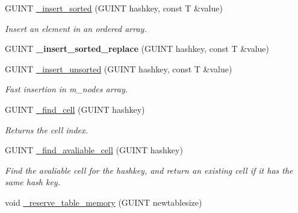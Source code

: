 \begin{DoxyCompactItemize}
\mbox{\label{classgim__hash__table_a66d18cb60b0628a9aa759304395f4825}} 
G\+U\+I\+NT \hyperlink{classgim__hash__table_a66d18cb60b0628a9aa759304395f4825}{\+\_\+insert\+\_\+sorted} (G\+U\+I\+NT hashkey, const T \&value)
\begin{DoxyCompactList}\small\item\em Insert an element in an ordered array. \end{DoxyCompactList}\item 
\mbox{\label{classgim__hash__table_ac221e1462f7711085b1260fc229b6183}} 
G\+U\+I\+NT {\bfseries \+\_\+insert\+\_\+sorted\+\_\+replace} (G\+U\+I\+NT hashkey, const T \&value)
\item 
\mbox{\label{classgim__hash__table_a95f93f63d75663f494388dc03423332f}} 
G\+U\+I\+NT \hyperlink{classgim__hash__table_a95f93f63d75663f494388dc03423332f}{\+\_\+insert\+\_\+unsorted} (G\+U\+I\+NT hashkey, const T \&value)
\begin{DoxyCompactList}\small\item\em Fast insertion in m\+\_\+nodes array. \end{DoxyCompactList}\item 
\mbox{\label{classgim__hash__table_aaaff4cea9e6b86276d364041e651605f}} 
G\+U\+I\+NT \hyperlink{classgim__hash__table_aaaff4cea9e6b86276d364041e651605f}{\+\_\+find\+\_\+cell} (G\+U\+I\+NT hashkey)
\begin{DoxyCompactList}\small\item\em Returns the cell index. \end{DoxyCompactList}\item 
\mbox{\label{classgim__hash__table_acc2d3d29a0190232386fb155ec9e5d8f}} 
G\+U\+I\+NT \hyperlink{classgim__hash__table_acc2d3d29a0190232386fb155ec9e5d8f}{\+\_\+find\+\_\+avaliable\+\_\+cell} (G\+U\+I\+NT hashkey)
\begin{DoxyCompactList}\small\item\em Find the avaliable cell for the hashkey, and return an existing cell if it has the same hash key. \end{DoxyCompactList}\item 
void \hyperlink{classgim__hash__table_a4d9347e131c0e17ac2d4966c092817f8}{\+\_\+reserve\+\_\+table\+\_\+memory} (G\+U\+I\+NT newtablesize)

\end{DoxyCompactItemize}
